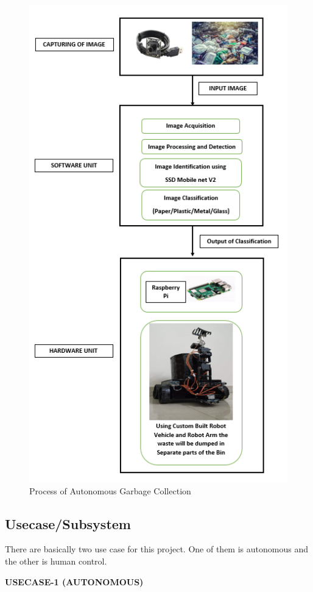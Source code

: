\documentclass[conference]{IEEEtran}
\begin{document}
	\begin{figure}[htbp]
		\centerline{\includegraphics[scale=0.4]{fig.png}}
		\caption{Process of Autonomous Garbage Collection}
		\label{fig}
	\end{figure}
	
	
	\subsection{Usecase/Subsystem}
	
	There are basically two use case for this project. One of them is autonomous and the other is human control.\\
	
	
	\centerline{\textbf {USECASE-1 (AUTONOMOUS)}}
	
\end{document}
